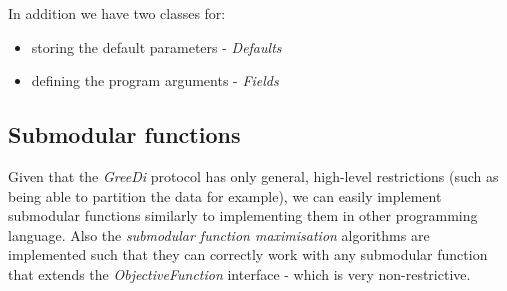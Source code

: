 In addition we have two classes for:
\begin{itemize}
  \item storing the default parameters - \emph{Defaults}
  \item defining the program arguments - \emph{Fields}
\end{itemize}

\subsection{Submodular functions}

Given that the \emph{GreeDi} protocol has only general, high-level restrictions
(such as being able to partition the data for example), we can easily implement
submodular functions similarly to implementing them in other programming
language. Also the \emph{submodular function maximisation} algorithms are
implemented such that they can correctly work with any submodular function that
extends the \emph{ObjectiveFunction} interface - which is very non-restrictive.

